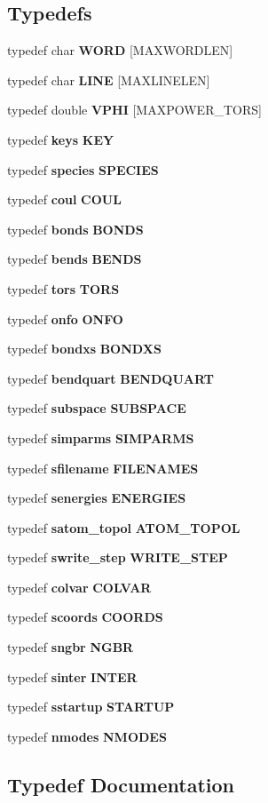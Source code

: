 \subsection*{Typedefs}
\begin{CompactItemize}
\item 
typedef char {\bf WORD} [MAXWORDLEN]
\item 
typedef char {\bf LINE} [MAXLINELEN]
\item 
typedef double {\bf VPHI} [MAXPOWER\_\-TORS]
\item 
typedef {\bf keys} {\bf KEY}
\item 
typedef {\bf species} {\bf SPECIES}
\item 
typedef {\bf coul} {\bf COUL}
\item 
typedef {\bf bonds} {\bf BONDS}
\item 
typedef {\bf bends} {\bf BENDS}
\item 
typedef {\bf tors} {\bf TORS}
\item 
typedef {\bf onfo} {\bf ONFO}
\item 
typedef {\bf bondxs} {\bf BONDXS}
\item 
typedef {\bf bendquart} {\bf BENDQUART}
\item 
typedef {\bf subspace} {\bf SUBSPACE}
\item 
typedef {\bf simparms} {\bf SIMPARMS}
\item 
typedef {\bf sfilename} {\bf FILENAMES}
\item 
typedef {\bf senergies} {\bf ENERGIES}
\item 
typedef {\bf satom\_\-topol} {\bf ATOM\_\-TOPOL}
\item 
typedef {\bf swrite\_\-step} {\bf WRITE\_\-STEP}
\item 
typedef {\bf colvar} {\bf COLVAR}
\item 
typedef {\bf scoords} {\bf COORDS}
\item 
typedef {\bf sngbr} {\bf NGBR}
\item 
typedef {\bf sinter} {\bf INTER}
\item 
typedef {\bf sstartup} {\bf STARTUP}
\item 
typedef {\bf nmodes} {\bf NMODES}
\end{CompactItemize}


\subsection{Typedef Documentation}

